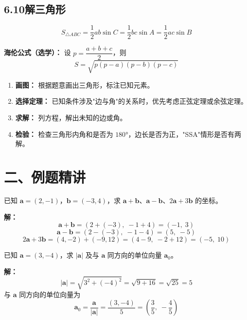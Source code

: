 \documentclass[12pt, a4paper]{ctexart}
\begin{document}
\subsection*{6.10\quad 解三角形}

\begin{knowledgebox}[三角形面积公式]
\[
S_{\triangle ABC}=\frac{1}{2}ab\sin C=\frac{1}{2}bc\sin A=\frac{1}{2}ac\sin B
\]

\textbf{海伦公式（选学）：} 设 $p=\dfrac{a+b+c}{2}$，则
\[
S=\sqrt{p(p-a)(p-b)(p-c)}
\]
\end{knowledgebox}

\begin{tipbox}[解三角形的一般步骤]
\begin{enumerate}[leftmargin=2em]
  \item \textbf{画图：} 根据题意画出三角形，标注已知元素。
  \item \textbf{选择定理：} 已知条件涉及"边与角"的关系时，优先考虑正弦定理或余弦定理。
  \item \textbf{求解：} 列方程，解出未知的边或角。
  \item \textbf{检验：} 检查三角形内角和是否为 $180°$，边长是否为正，"SSA"情形是否有两解。
\end{enumerate}
\end{tipbox}

\section*{\textcolor{examorange}{二、例题精讲}}

\begin{examplebox}[【例题1】向量加减法的坐标运算]
已知 $\boldsymbol{a}=(2,-1)$，$\boldsymbol{b}=(-3,4)$，求 $\boldsymbol{a}+\boldsymbol{b}$、$\boldsymbol{a}-\boldsymbol{b}$、$2\boldsymbol{a}+3\boldsymbol{b}$ 的坐标。

\textbf{解：}
\[
\boldsymbol{a}+\boldsymbol{b}=(2+(-3),\;-1+4)=(-1,\;3)
\]
\[
\boldsymbol{a}-\boldsymbol{b}=(2-(-3),\;-1-4)=(5,\;-5)
\]
\[
2\boldsymbol{a}+3\boldsymbol{b}=(4,-2)+(-9,12)=(4-9,\;-2+12)=(-5,\;10)
\]
\end{examplebox}

\begin{examplebox}[【例题2】向量的模与单位向量]
已知 $\boldsymbol{a}=(3,-4)$，求 $|\boldsymbol{a}|$ 及与 $\boldsymbol{a}$ 同方向的单位向量 $\boldsymbol{a}_0$。

\textbf{解：}
\[
|\boldsymbol{a}|=\sqrt{3^2+(-4)^2}=\sqrt{9+16}=\sqrt{25}=5
\]
与 $\boldsymbol{a}$ 同方向的单位向量为
\[
\boldsymbol{a}_0=\frac{\boldsymbol{a}}{|\boldsymbol{a}|}=\frac{(3,-4)}{5}=\left(\frac{3}{5},\;-\frac{4}{5}\right)
\]
\end{examplebox}
\end{document}
